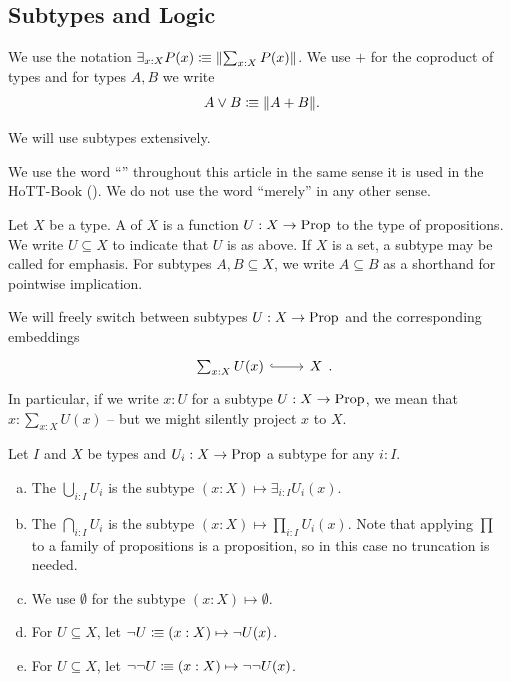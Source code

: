 \subsection{Subtypes and Logic}

We use the notation $\exists_{x:X}P(x)\vcentcolon\mspace{-1.2mu}\equiv \lVert \sum_{x:X}P(x) \rVert$.
We use $+$ for the coproduct of types and for types $A,B$ we write
\[ A\vee B\colonequiv \propTrunc{ A+B }\rlap{.}\]

We will use subtypes extensively.

\begin{remark}
  We use the word ``'' throughout this article in the same sense it is used in the HoTT-Book (\cite{hott}).
  We do not use the word ``merely'' in any other sense.
\end{remark}

\begin{definition}
  \index{$\subseteq$}
  Let $X$ be a type.
  A  of $X$ is a function $U:X\to\mathrm{Prop}$ to the type of propositions.
  We write $U\subseteq X$ to indicate that $U$ is as above.
  If $X$ is a set, a subtype may be called  for emphasis.
  For subtypes $A,B\subseteq X$, we write $A\subseteq B$ as a shorthand for pointwise implication.
\end{definition}

We will freely switch between subtypes $U:X\to\mathrm{Prop}$ and the corresponding embeddings
\[
  \begin{tikzcd}
    \sum_{x:X}U(x) \ar[r,hook] & X
  \end{tikzcd}
  \rlap{.}
\]
In particular, if we write $x:U$ for a subtype $U:X\to\mathrm{Prop}$, we mean that $x:\sum_{x:X}U(x)$ -- but we might silently project $x$ to $X$.

\begin{definition}
  Let $I$ and $X$ be types and $U_i:X\to\mathrm{Prop}$ a subtype for any $i:I$.
  \begin{enumerate}[(a)]
  \item The  $\bigcup_{i:I}U_i$ is the subtype $(x:X)\mapsto \exists_{i:I}U_i(x)$.
  \item The  $\bigcap_{i:I}U_i$ is the subtype $(x:X)\mapsto\prod_{i:I}U_i(x)$. Note that applying $\prod$ to a family of propositions is a proposition, so in this case no truncation is needed.
  \item We use $\emptyset$ for the subtype $(x:X)\mapsto \emptyset$. \index{$\emptyset$}
  \item For $U\subseteq X$, let $\neg U\vcentcolon\mspace{-1.2mu}\equiv (x:X)\mapsto \neg U(x)$. 
  \item For $U\subseteq X$, let $\neg\neg U\vcentcolon\mspace{-1.2mu}\equiv (x:X)\mapsto \neg\neg U(x)$. 
  \end{enumerate}
\end{definition}

